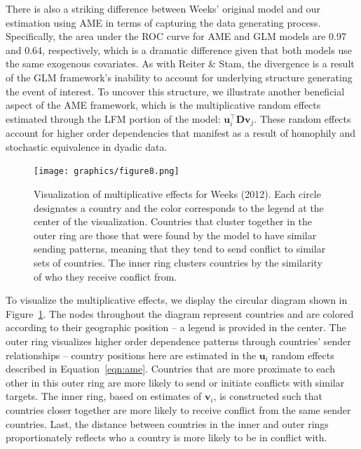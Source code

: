 There is also a striking difference between Weeks' original model and our estimation using AME in terms of capturing the data generating process. Specifically, the area under the ROC curve for AME and GLM models are 0.97 and 0.64, respectively, which is a dramatic difference given that both models use the same exogenous covariates. As with Reiter \& Stam, the divergence is a result of the GLM framework's inability to account for underlying structure generating the event of interest. To uncover this structure, we illustrate another beneficial aspect of the AME framework, which is the multiplicative random effects estimated through the LFM portion of the model: $\mathbf{u}_{i}^{\top} \mathbf{D} \mathbf{v}_{j}$. These random effects account for higher order dependencies that manifest as a result of homophily and stochastic equivalence in dyadic data.

\begin{figure}[!h]
	\texttt{[image: graphics/figure8.png]}
	\caption{ Visualization of multiplicative effects for Weeks (2012). Each circle designates a country and the color corresponds to the legend at the center of the visualization. Countries that cluster together in the outer ring are those that were found by the model to have similar sending patterns, meaning that they tend to send conflict to similar sets of countries. The inner ring clusters countries by the similarity of who they receive conflict from.
	}
	\label{fig:weekscirc}
\end{figure}
\FloatBarrier

To visualize the multiplicative effects, we display the circular diagram shown in Figure~\ref{fig:weekscirc}. The nodes throughout the diagram represent countries and are colored according to their geographic position -- a legend is provided in the center. The outer ring visualizes higher order dependence patterns through countries' sender relationships -- country positions here are estimated in the $\mathbf{u}_{i}$ random effects described in Equation~\ref{eqn:ame}. Countries that are more proximate to each other in this outer ring are more likely to send or initiate conflicts with similar targets. The inner ring, based on estimates of $\mathbf{v}_{i}$, is constructed such that countries closer together are more likely to receive conflict from the same sender countries. Last, the distance between countries in the inner and outer rings proportionately reflects who a country is more likely to be in conflict with.

